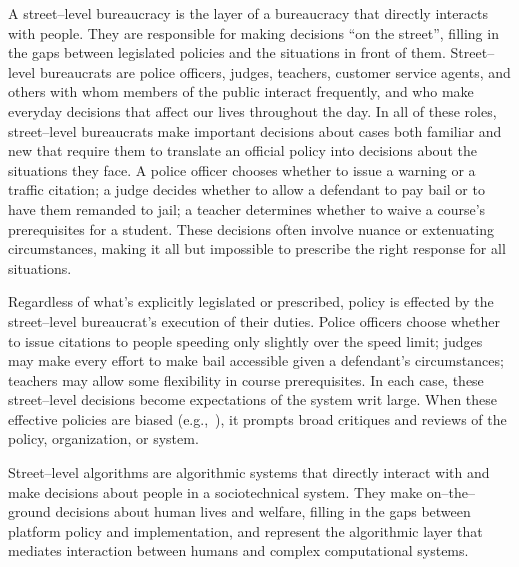 \documentclass[street-level_algorithms]{subfiles}
\begin{document}
A street--level bureaucracy is the layer of a bureaucracy that directly interacts with people.
They are responsible for making decisions ``on the street'',
filling in the gaps between legislated policies and the situations in front of them.
Street--level bureaucrats are
police officers, judges, teachers, customer service agents, and others
with whom members of the public interact frequently, and
who make everyday decisions that affect our lives throughout the day.
In all of these roles,
street--level bureaucrats make important decisions about
cases both familiar and new that require them to translate an official policy into decisions about the situations they face.
A police officer chooses whether to issue a warning or a traffic citation;
a judge decides whether to allow a defendant to pay bail or to have them remanded to jail;
a teacher determines whether to waive a course's prerequisites for a student.
These decisions often involve nuance or extenuating circumstances,
making it all but impossible to prescribe the right response for all situations.

Regardless of what's explicitly legislated or prescribed,
policy is effected by the street--level bureaucrat's execution of their duties.
Police officers choose whether to issue citations to people speeding only slightly over the speed limit;
judges may make every effort to make bail accessible given a defendant's circumstances;
teachers may allow some flexibility in course prerequisites.
In each case, these street--level decisions become expectations of the system writ large.
When these effective policies are biased
(e.g.,~\cite{Voigt6521}),
it prompts broad critiques and reviews of the policy, organization, or system.


Street--level algorithms are algorithmic systems that directly interact with and make decisions about people in a sociotechnical system.
They make on--the--ground decisions about human lives and welfare,
filling in the gaps between platform policy and implementation, and
represent the algorithmic layer that mediates interaction between humans and complex computational systems.
\end{document}
